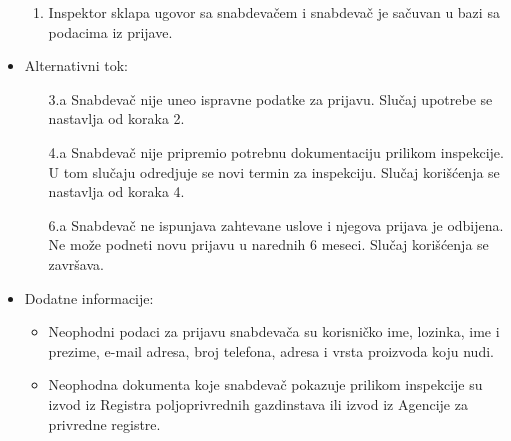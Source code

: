 \begin{itemize}
\begin{enumerate}
		    \item Inspektor sklapa ugovor sa snabdevačem i snabdevač je sačuvan u bazi sa podacima iz prijave.
		\end{enumerate}
	\item Alternativni tok:
		\begin{itemize}
    		\item[3.a] Snabdevač nije uneo ispravne podatke za prijavu. Slučaj upotrebe se nastavlja od koraka 2.
		    \item[4.a] Snabdevač nije pripremio potrebnu dokumentaciju prilikom inspekcije. U tom slučaju odredjuje se novi termin za inspekciju. Slučaj korišćenja se nastavlja od koraka 4.
		    \item[6.a] Snabdevač ne ispunjava zahtevane uslove i njegova prijava je odbijena. Ne može podneti novu prijavu u narednih 6 meseci. Slučaj korišćenja se završava.
		\end{itemize}
	\item Dodatne informacije:
		\begin{itemize}
			\item Neophodni podaci za prijavu snabdevača su korisničko ime, lozinka, ime i prezime, e-mail adresa, broj telefona, adresa i vrsta proizvoda koju nudi. 
			\item Neophodna dokumenta koje snabdevač pokazuje prilikom inspekcije su izvod iz Registra poljoprivrednih gazdinstava ili izvod iz Agencije za privredne registre.
		\end{itemize}						
\end{itemize}